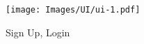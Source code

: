 
\begin{figure}[H]
	\centering
    \texttt{[image: Images/UI/ui-1.pdf]}
	\caption{\label{fig:ui_sign_up}Sign Up, Login}
\end{figure}